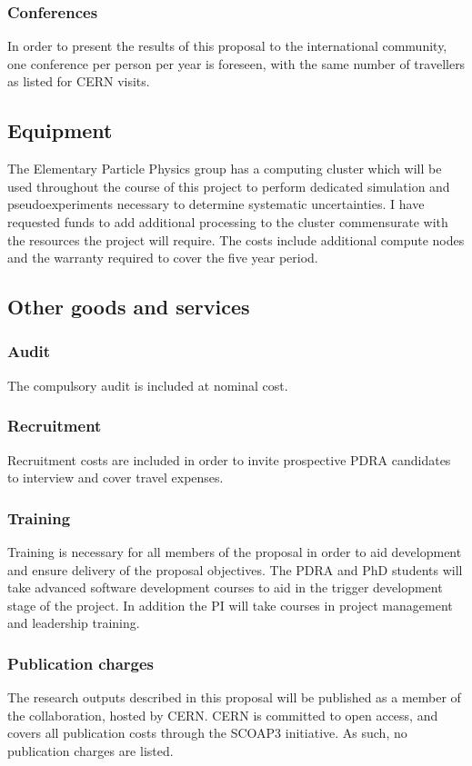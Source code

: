 \documentclass[11pt,a4paper]{article}
\begin{document}
\subsubsection{Conferences}
In order to present the results of this proposal to the international community, one conference per person per year is foreseen, with the same number of travellers as listed for CERN visits. 

\subsection{Equipment}
The Elementary Particle Physics group has a computing cluster which will be used throughout the course of this project to perform dedicated simulation and pseudoexperiments necessary to determine systematic uncertainties. I have requested funds to add additional processing to the cluster commensurate with the resources the project will require. The costs include additional compute nodes and the warranty required to cover the five year period. 

\subsection{Other goods and services}
\subsubsection{Audit}
The compulsory audit is included at nominal cost. 
\subsubsection{Recruitment}
Recruitment costs are included in order to invite prospective PDRA candidates to interview and cover travel expenses. 

\subsubsection{Training}
Training is necessary for all members of the proposal in order to aid development and ensure delivery of the proposal objectives. The PDRA and PhD students will take advanced software development courses to aid in the trigger development stage of the project. In addition the PI will take courses in project management and leadership training. 

\subsubsection{Publication charges}
The research outputs described in this proposal will be published as a member of the \LHCb collaboration, hosted by CERN. CERN is committed to open access, and covers all publication costs through the SCOAP3 initiative. As such, no publication charges are listed.   
\end{document}
